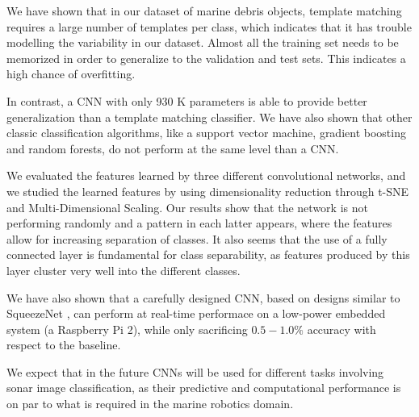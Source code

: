 We have shown that in our dataset of marine debris objects, template matching requires a large number of templates per class, which indicates that it has trouble modelling the variability in our dataset. Almost all the training set needs to be memorized in order to generalize to the validation and test sets. This indicates a high chance of overfitting.

In contrast, a CNN with only 930 K parameters is able to provide better generalization than a template matching classifier. We have also shown that other classic classification algorithms, like a support vector machine, gradient boosting and random forests, do not perform at the same level than a CNN.

We evaluated the features learned by three different convolutional networks, and we studied the learned features by using dimensionality reduction through t-SNE and Multi-Dimensional Scaling. Our results show that the network is not performing randomly and a pattern in each latter appears, where the features allow for increasing separation of classes. It also seems that the use of a fully connected layer is fundamental for class separability, as features produced by this layer cluster very well into the different classes.

We have also shown that a carefully designed CNN, based on designs similar to SqueezeNet \cite[-4em]{iandola2016squeezenet}, can perform at real-time performace on a low-power embedded system (a Raspberry Pi 2), while only sacrificing $0.5-1.0 \%$ accuracy with respect to the baseline.

We expect that in the future CNNs will be used for different tasks involving sonar image classification, as their predictive and computational performance is on par to what is required in the marine robotics domain.